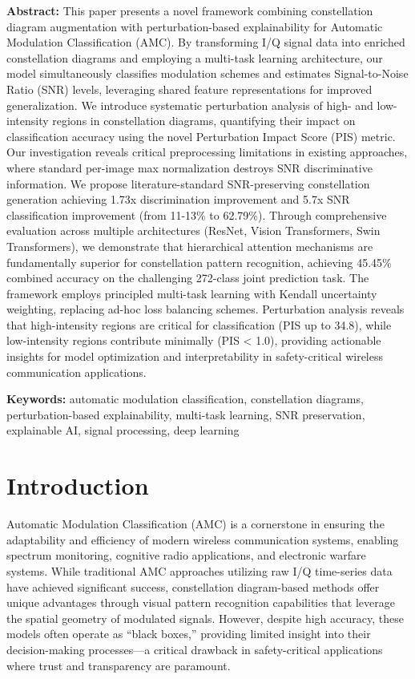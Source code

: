 \documentclass{ELSP}
\begin{document}
\noindent\textbf{\textbf{\textcolor[RGB]{0,131,255}{Abstract:}}} This paper presents a novel framework combining constellation diagram augmentation with perturbation-based explainability for Automatic Modulation Classification (AMC). By transforming I/Q signal data into enriched constellation diagrams and employing a multi-task learning architecture, our model simultaneously classifies modulation schemes and estimates Signal-to-Noise Ratio (SNR) levels, leveraging shared feature representations for improved generalization. We introduce systematic perturbation analysis of high- and low-intensity regions in constellation diagrams, quantifying their impact on classification accuracy using the novel Perturbation Impact Score (PIS) metric. Our investigation reveals critical preprocessing limitations in existing approaches, where standard per-image max normalization destroys SNR discriminative information. We propose literature-standard SNR-preserving constellation generation achieving 1.73x discrimination improvement and 5.7x SNR classification improvement (from 11-13\% to 62.79\%). Through comprehensive evaluation across multiple architectures (ResNet, Vision Transformers, Swin Transformers), we demonstrate that hierarchical attention mechanisms are fundamentally superior for constellation pattern recognition, achieving 45.45\% combined accuracy on the challenging 272-class joint prediction task. The framework employs principled multi-task learning with Kendall uncertainty weighting, replacing ad-hoc loss balancing schemes. Perturbation analysis reveals that high-intensity regions are critical for classification (PIS up to 34.8), while low-intensity regions contribute minimally (PIS < 1.0), providing actionable insights for model optimization and interpretability in safety-critical wireless communication applications.

\noindent\textbf{\textcolor[RGB]{0,131,255}{Keywords:}} automatic modulation classification, constellation diagrams, perturbation-based explainability, multi-task learning, SNR preservation, explainable AI, signal processing, deep learning

\section{Introduction}

Automatic Modulation Classification (AMC) is a cornerstone in ensuring the adaptability and efficiency of modern wireless communication systems, enabling spectrum monitoring, cognitive radio applications, and electronic warfare systems. While traditional AMC approaches utilizing raw I/Q time-series data have achieved significant success, constellation diagram-based methods offer unique advantages through visual pattern recognition capabilities that leverage the spatial geometry of modulated signals. However, despite high accuracy, these models often operate as ``black boxes,'' providing limited insight into their decision-making processes—a critical drawback in safety-critical applications where trust and transparency are paramount.
\end{document}
